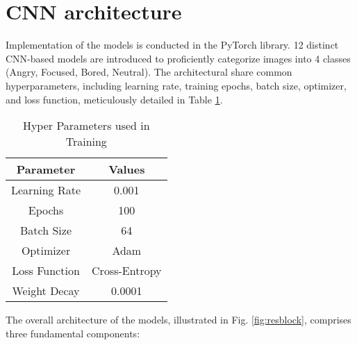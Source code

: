 \documentclass[]{report}
\begin{document}
\section{CNN architecture}

Implementation of the models is conducted in the PyTorch library\cite{torch}. 12 distinct CNN-based models are introduced to proficiently categorize images into 4 classes (Angry, Focused, Bored, Neutral). The architectural share common hyperparameters, including learning rate, training epochs, batch size, optimizer, and loss function, meticulously detailed in Table \ref{tab:hyper}.

\begin{table}[h]

\centering
\caption{Hyper Parameters used in Training}
\begin{tabular}{|c|c|}
\hline
Parameter        & Values      \\
\hline
Learning Rate    & 0.001       \\
Epochs           & 100         \\
Batch Size       & 64          \\
Optimizer        & Adam        \\
Loss Function    & Cross-Entropy\\
Weight Decay     & 0.0001      \\
\hline
\end{tabular}
\label{tab:hyper}
\end{table}

The overall architecture of the models, illustrated in Fig. \ref{fig:resblock}, comprises three fundamental components:
\end{document}
